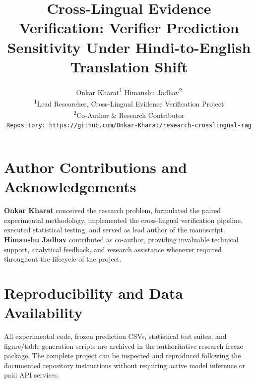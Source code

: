 \documentclass[11pt,a4paper]{article}
\title{Cross-Lingual Evidence Verification: Verifier Prediction Sensitivity Under Hindi-to-English Translation Shift}
\author{Onkar Kharat\textsuperscript{1} \quad Himanshu Jadhav\textsuperscript{2} \\
  \textsuperscript{1}Lead Researcher, Cross-Lingual Evidence Verification Project \\
  \textsuperscript{2}Co-Author \& Research Contributor \\
  \texttt{Repository: https://github.com/Onkar-Kharat/research-crosslingual-rag} \\
}
\date{}
\begin{document}
\maketitle












\section*{Author Contributions and Acknowledgements}
\textbf{Onkar Kharat} conceived the research problem, formulated the paired experimental methodology, implemented the cross-lingual verification pipeline, executed statistical testing, and served as lead author of the manuscript. \textbf{Himanshu Jadhav} contributed as co-author, providing invaluable technical support, analytical feedback, and research assistance whenever required throughout the lifecycle of the project.

\section*{Reproducibility and Data Availability}
All experimental code, frozen prediction CSVs, statistical test suites, and figure/table generation scripts are archived in the authoritative research freeze package. The complete project can be inspected and reproduced following the documented repository instructions without requiring active model inference or paid API services.




\clearpage

\end{document}
